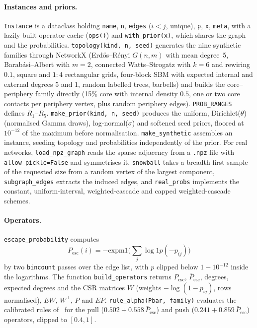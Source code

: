 \documentclass[11pt,a4paper]{article}
\theoremstyle{definition}
\theoremstyle{plain}
\newcommand{\Pesc}{P_{\mathrm{esc}}}
\newcommand{\Pescbar}{\bar{P}_{\mathrm{esc}}}
\begin{document}
\paragraph{Instances and priors.} \texttt{Instance} is a dataclass holding \texttt{name}, \texttt{n}, \texttt{edges} ($i<j$, unique), \texttt{p}, \texttt{x}, \texttt{meta}, with a lazily built operator cache (\texttt{ops()}) and \texttt{with\_prior(x)}, which shares the graph and the probabilities. \texttt{topology(kind, n, seed)} generates the nine synthetic families through NetworkX (Erdős--Rényi $G(n,m)$ with mean degree~5, Barabási--Albert with $m=2$, connected Watts--Strogatz with $k=6$ and rewiring $0.1$, square and $1{:}4$ rectangular grids, four-block SBM with expected internal and external degrees 5 and 1, random labelled trees, barbells) and builds the core--periphery family directly (15\% core with internal density $0.5$, one or two core contacts per periphery vertex, plus random periphery edges). \texttt{PROB\_RANGES} defines $R_1$--$R_5$. \texttt{make\_prior(kind, n, seed)} produces the uniform, Dirichlet($\theta$) (normalised Gamma draws), log-normal($\sigma$) and softened seed priors, floored at $10^{-12}$ of the maximum before normalisation. \texttt{make\_synthetic} assembles an instance, seeding topology and probabilities independently of the prior. For real networks, \texttt{load\_npz\_graph} reads the sparse adjacency from a \texttt{.npz} file with \texttt{allow\_pickle=False} and symmetrises it, \texttt{snowball} takes a breadth-first sample of the requested size from a random vertex of the largest component, \texttt{subgraph\_edges} extracts the induced edges, and \texttt{real\_probs} implements the constant, uniform-interval, weighted-cascade and capped weighted-cascade schemes.

\paragraph{Operators.} \texttt{escape\_probability} computes
\[
\Pesc(i)=-\mathrm{expm1}\Big(\sum_j\log1p(-p_{ij})\Big)
\]
by two \texttt{bincount} passes over the edge list, with $p$ clipped below $1-10^{-12}$ inside the logarithms. The function \texttt{build\_operators} returns $\Pesc$, $\Pescbar$, degrees, expected degrees and the CSR matrices $W$ (weights $-\log(1-p_{ij})$, rows normalised), $EW$, $W^{\top}$, $P$ and $EP$. \texttt{rule\_alpha(Pbar, family)} evaluates the calibrated rules of~\cite{konstantellos26} for the pull ($0.502+0.558\,\Pescbar$) and push ($0.241+0.859\,\Pescbar$) operators, clipped to $[0.4,1]$.
\end{document}
